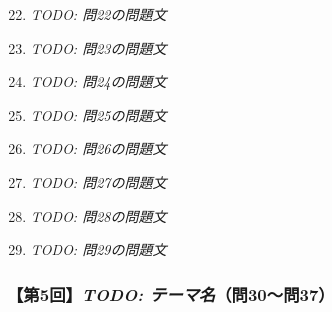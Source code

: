 \documentclass[b4paper,7pt,twocolumn,landscape]{jsarticle}
\begin{document}
\begin{enumerate}
\setcounter{enumi}{21}
\item \textit{TODO: 問22の問題文}\\

\newpage

\item \textit{TODO: 問23の問題文}\\

\item \textit{TODO: 問24の問題文}\\

\item \textit{TODO: 問25の問題文}\\

\item \textit{TODO: 問26の問題文}\\

\item \textit{TODO: 問27の問題文}\\

\item \textit{TODO: 問28の問題文}\\

\item \textit{TODO: 問29の問題文}\\
\end{enumerate}

\subsubsection*{【第5回】\textit{TODO: テーマ名}（問30〜問37）}
\end{document}
